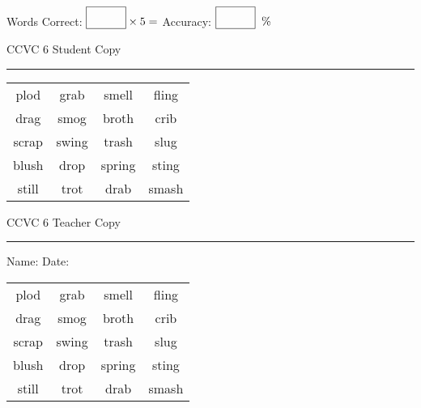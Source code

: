 \documentclass{memoir}
\begin{document}
\small

Words Correct: $\fbox{\phantom{\huge 100}} \times 5 = $ Accuracy: $\fbox{\phantom{\huge 100}}\;\; \%$ 

\vfill

\newpage


\footnotesize \noindent
CCVC 6 \hfill Student Copy
\smallskip
\hrule

\Large

\setlength{\tabcolsep}{14pt}
\def\arraystretch{3}

{\selectfont


\begin{vplace}[0.5]
\begin{center}
\begin{tabular}{cccc}
plod & grab                    & smell & fling \\
drag        & smog & broth    & crib \\
scrap & swing & trash & slug \\
blush & drop & spring & sting \\
still & trot & drab             & smash \\
\end{tabular}
\end{center}
\end{vplace}

}

\newpage

\footnotesize \noindent
CCVC 6 \hfill Teacher Copy
\smallskip
\hrule

\small

\vfill

\noindent
Name: \underline{\hspace{1.75in}} \hfill Date: \underline{\hspace{1in}}

\Large

{\selectfont


\begin{vplace}[0.5]
\begin{center}
\begin{tabular}{cccc}
plod & grab                    & smell & fling \\
drag        & smog & broth    & crib \\
scrap & swing & trash & slug \\
blush & drop & spring & sting \\
still & trot & drab             & smash \\
\end{tabular}
\end{center}
\end{vplace}



}
\end{document}
